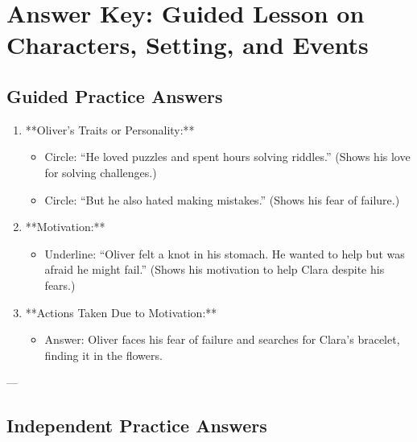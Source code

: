\documentclass[12pt]{article}
\begin{document}
\section*{Answer Key: Guided Lesson on Characters, Setting, and Events}

\subsection*{Guided Practice Answers}

\begin{enumerate}
    \item **Oliver’s Traits or Personality:** 
    \begin{itemize}
        \item Circle: “He loved puzzles and spent hours solving riddles.” (Shows his love for solving challenges.)
        \item Circle: “But he also hated making mistakes.” (Shows his fear of failure.)
    \end{itemize}
    
    \item **Motivation:** 
    \begin{itemize}
        \item Underline: “Oliver felt a knot in his stomach. He wanted to help but was afraid he might fail.” (Shows his motivation to help Clara despite his fears.)
    \end{itemize}
    
    \item **Actions Taken Due to Motivation:** 
    \begin{itemize}
        \item Answer: Oliver faces his fear of failure and searches for Clara’s bracelet, finding it in the flowers.
    \end{itemize}
\end{enumerate}

---

\subsection*{Independent Practice Answers}
\end{document}
